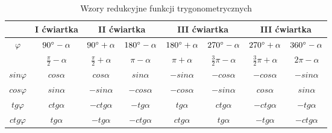     \begin{table}[htbp]
        \footnotesize
        \centering
        \caption{Wzory redukcyjne funkcji trygonometrycznych}
        \label{tab:wzory_redukcyjne_tryg}
        \vspace{3mm}
        \begin{tabular}{c|c|cc|cc|cc|}
             & I ćwiartka & \multicolumn{2}{|c|}{II ćwiartka} & \multicolumn{2}{|c|}{III ćwiartka} & \multicolumn{2}{|c|}{III ćwiartka}\\
             \midrule
             \multirow{2}{*}{$\varphi$} & $90\degree - \alpha$ & $90\degree+\alpha$ & $180\degree - \alpha$ & $180\degree+\alpha$ & $270\degree - \alpha$ & $270\degree+\alpha$ & $360\degree-\alpha$ \\
             & $\frac{\pi}{2} - \alpha$ & $\frac{\pi}{2} + \alpha$ & $\pi - \alpha$ & $\pi + \alpha$ & $\frac{3}{2}\pi - \alpha$ & $\frac{3}{2}\pi + \alpha$ & $2\pi - \alpha$ \\ 
             \midrule
            $sin \varphi$ & $cos\alpha$ & $cos\alpha$ & $sin\alpha$ & $-sin\alpha$ & $-cos\alpha$ & $-cos\alpha$ & $-sin\alpha$ \\
            $cos \varphi$ & $sin\alpha$ & $-sin\alpha$ & $-cos\alpha$ & $-cos\alpha$ & $-sin\alpha$ & $cos\alpha$ & $sin\alpha$ \\
            $tg \varphi$ & $ctg\alpha$ & $-ctg\alpha$ & $-tg\alpha$ & $tg\alpha$ & $ctg\alpha$ & $-ctg\alpha$ & $-tg\alpha$ \\
            $ctg \varphi$ & $tg\alpha$ & $-tg\alpha$ & $-ctg\alpha$ & $ctg\alpha$ & $tg\alpha$ & $-tg\alpha$ & $-ctg\alpha$ \\
            \bottomrule
        \end{tabular}
    \end{table}

